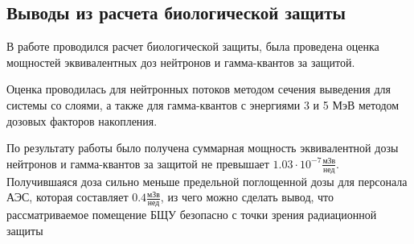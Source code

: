 \subsection{Выводы из расчета биологической защиты}
В работе проводился расчет биологической защиты, была проведена оценка мощностей эквивалентных доз нейтронов и гамма-квантов за защитой.

Оценка проводилась для нейтронных потоков методом сечения выведения для системы со слоями, а также для гамма-квантов с энергиями 3 и 5 МэВ методом дозовых факторов накопления.

По результату работы было получена суммарная мощность эквивалентной дозы нейтронов и гамма-квантов за защитой не превышает $1.03 \cdot 10^{- 7} \frac{\text{мЗв}}{\text{нед}}$. Получившаяся доза сильно меньше предельной поглощенной дозы для персонала АЭС, которая составляет $0.4 \frac{\text{мЗв}}{\text{нед}}$, из чего можно сделать вывод, что рассматриваемое помещение БЩУ безопасно с точки зрения радиационной защиты

